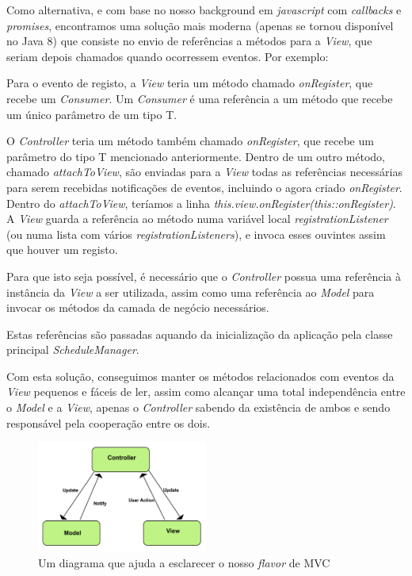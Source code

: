 \documentclass[a4paper]{article}
\begin{document}
Como alternativa, e com base no nosso background em \emph{javascript} com \emph{callbacks} e \emph{promises}, encontramos uma solução mais moderna (apenas se tornou disponível no Java 8) que consiste no envio de referências a métodos para a \emph{View}, que seriam depois chamados quando ocorressem eventos. Por exemplo:

\vspace{3mm}



Para o evento de registo, a \emph{View} teria um método chamado \emph{onRegister}, que recebe um \emph{Consumer}. Um \emph{Consumer} é uma referência a um método que recebe um único parâmetro de um tipo T.

O \emph{Controller} teria um método também chamado \emph{onRegister}, que recebe um parâmetro do tipo T mencionado anteriormente. Dentro de um outro método, chamado \emph{attachToView}, são enviadas para a \emph{View} todas as referências necessárias para serem recebidas notificações de eventos, incluindo o agora criado \emph{onRegister}. Dentro do \emph{attachToView}, teríamos a linha \emph{this.view.onRegister(this::onRegister)}. A \emph{View} guarda a referência ao método numa variável local \emph{registrationListener} (ou numa lista com vários \emph{registrationListeners}), e invoca esses ouvintes assim que houver um registo.

\vspace{3mm}

Para que isto seja possível, é necessário que o \emph{Controller} possua uma referência à instância da \emph{View} a ser utilizada, assim como uma referência ao \emph{Model} para invocar os métodos da camada de negócio necessários.

Estas referências são passadas aquando da inicialização da aplicação pela classe principal \emph{ScheduleManager}.

Com esta solução, conseguimos manter os métodos relacionados com eventos da \emph{View} pequenos e fáceis de ler, assim como alcançar uma total independência entre o \emph{Model} e a \emph{View}, apenas o \emph{Controller} sabendo da existência de ambos e sendo responsável pela cooperação entre os dois.

\begin{figure}[h]
\centering
\includegraphics[width=0.5\textwidth]{mvcflavor}
\caption{Um diagrama que ajuda a esclarecer o nosso \emph{flavor} de MVC}
\label{}
\end{figure}
\end{document}
